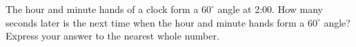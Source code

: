 The hour and minute hands of a clock form a $60^\circ$ angle at 2:00. How many seconds later is the next time when the hour and minute hands form a $60^\circ$ angle? Express your answer to the nearest whole number.
